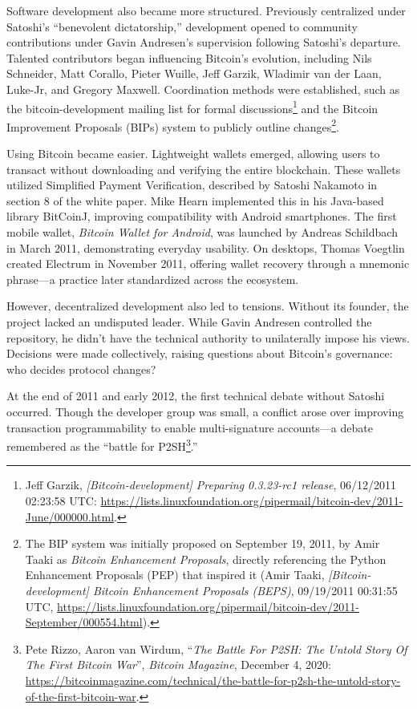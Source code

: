 \documentclass[
  a5paper,
  smalldemyvopaper,10pt,twoside,onecolumn,openright,extrafontsizes,hidelinks]{memoir}
\begin{document}
Software development also became more structured. Previously centralized
under Satoshi's ``benevolent dictatorship,'' development opened to
community contributions under Gavin Andresen's supervision following
Satoshi's departure. Talented contributors began influencing Bitcoin's
evolution, including Nils Schneider, Matt Corallo, Pieter Wuille, Jeff
Garzik, Wladimir van der Laan, Luke-Jr, and Gregory Maxwell.
Coordination methods were established, such as the bitcoin-development
mailing list for formal discussions\footnote{Jeff Garzik,
  \emph{{[}Bitcoin-development{]} Preparing 0.3.23-rc1 release},
  06/12/2011 02:23:58 UTC:
  \url{https://lists.linuxfoundation.org/pipermail/bitcoin-dev/2011-June/000000.html}.}
and the Bitcoin Improvement Proposals (BIPs) system to publicly outline
changes\footnote{The BIP system was initially proposed on September 19,
  2011, by Amir Taaki as \emph{Bitcoin Enhancement Proposals}, directly
  referencing the Python Enhancement Proposals (PEP) that inspired it
  (Amir Taaki, \emph{{[}Bitcoin-development{]} Bitcoin Enhancement
  Proposals (BEPS)}, 09/19/2011 00:31:55 UTC,
  \url{https://lists.linuxfoundation.org/pipermail/bitcoin-dev/2011-September/000554.html}).}.

Using Bitcoin became easier. Lightweight wallets emerged, allowing users
to transact without downloading and verifying the entire blockchain.
These wallets utilized Simplified Payment Verification, described by
Satoshi Nakamoto in section 8 of the white paper. Mike Hearn implemented
this in his Java-based library BitCoinJ, improving compatibility with
Android smartphones. The first mobile wallet, \emph{Bitcoin Wallet for
Android}, was launched by Andreas Schildbach in March 2011,
demonstrating everyday usability. On desktops, Thomas Voegtlin created
Electrum in November 2011, offering wallet recovery through a mnemonic
phrase---a practice later standardized across the ecosystem.

However, decentralized development also led to tensions. Without its
founder, the project lacked an undisputed leader. While Gavin Andresen
controlled the repository, he didn't have the technical authority to
unilaterally impose his views. Decisions were made collectively, raising
questions about Bitcoin's governance: who decides protocol changes?

At the end of 2011 and early 2012, the first technical debate without
Satoshi occurred. Though the developer group was small, a conflict arose
over improving transaction programmability to enable multi-signature
accounts---a debate remembered as the ``battle for P2SH\footnote{Pete
  Rizzo, Aaron van Wirdum, ``\emph{The Battle For P2SH: The Untold Story
  Of The First Bitcoin War}'', \emph{Bitcoin Magazine}, December 4,
  2020:
  \url{https://bitcoinmagazine.com/technical/the-battle-for-p2sh-the-untold-story-of-the-first-bitcoin-war}.}.''
\end{document}
